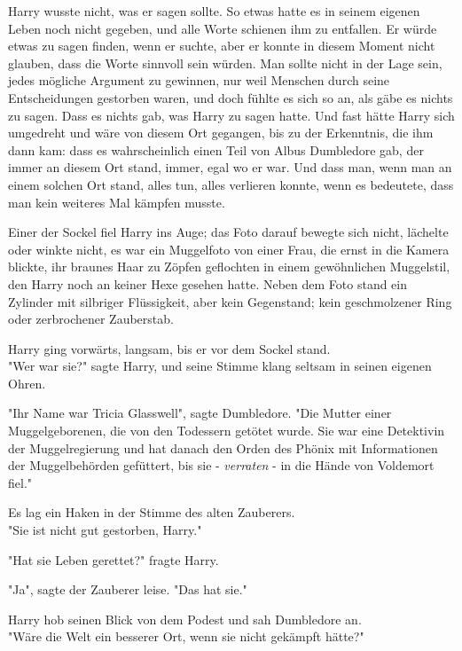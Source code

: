 {Harry wusste nicht, was er sagen sollte. So etwas hatte es in seinem eigenen Leben noch nicht gegeben, und alle Worte schienen ihm zu entfallen. Er würde etwas zu sagen finden, wenn er suchte, aber er konnte in diesem Moment nicht glauben, dass die Worte sinnvoll sein würden. Man sollte nicht in der Lage sein, jedes mögliche Argument zu gewinnen, nur weil Menschen durch seine Entscheidungen gestorben waren, und doch fühlte es sich so an, als gäbe es nichts zu sagen. Dass es nichts gab, was Harry zu sagen hatte. Und fast hätte Harry sich umgedreht und wäre von diesem Ort gegangen, bis zu der Erkenntnis, die ihm dann kam: dass es wahrscheinlich einen Teil von Albus Dumbledore gab, der immer an diesem Ort stand, immer, egal wo er war. Und dass man, wenn man an einem solchen Ort stand, alles tun, alles verlieren konnte, wenn es bedeutete, dass man kein weiteres Mal kämpfen musste.

Einer der Sockel fiel Harry ins Auge; das Foto darauf bewegte sich nicht, lächelte oder winkte nicht, es war ein Muggelfoto von einer Frau, die ernst in die Kamera blickte, ihr braunes Haar zu Zöpfen geflochten in einem gewöhnlichen Muggelstil, den Harry noch an keiner Hexe gesehen hatte. Neben dem Foto stand ein Zylinder mit silbriger Flüssigkeit, aber kein Gegenstand; kein geschmolzener Ring oder zerbrochener Zauberstab.

Harry ging vorwärts, langsam, bis er vor dem Sockel stand.\\ "Wer war sie?" sagte Harry, und seine Stimme klang seltsam in seinen eigenen Ohren.

"Ihr Name war Tricia Glasswell", sagte Dumbledore. "Die Mutter einer Muggelgeborenen, die von den Todessern getötet wurde. Sie war eine Detektivin der Muggelregierung und hat danach den Orden des Phönix mit Informationen der Muggelbehörden gefüttert, bis sie - \emph{verraten} - in die Hände von Voldemort fiel."

Es lag ein Haken in der Stimme des alten Zauberers.\\ "Sie ist nicht gut gestorben, Harry."

"Hat sie Leben gerettet?" fragte Harry.

"Ja", sagte der Zauberer leise. "Das hat sie."

Harry hob seinen Blick von dem Podest und sah Dumbledore an.\\ "Wäre die Welt ein besserer Ort, wenn sie nicht gekämpft hätte?"

}
